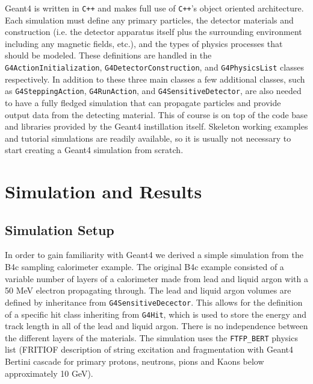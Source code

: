 \documentclass[aps,prd,twocolumn,nofootinbib]{revtex4-1}
\begin{document}
Geant4 is written in \texttt{C++} and makes full use of \texttt{C++}'s object oriented architecture. Each simulation must define any primary particles, the detector materials and construction (i.e. the detector apparatus itself plus the surrounding environment including any magnetic fields, etc.), and the types of physics processes that should be modeled. These definitions are handled in the \texttt{G4ActionInitialization}, \texttt{G4DetectorConstruction}, and \texttt{G4PhysicsList} classes respectively. In addition to these three main classes a few additional classes, such as \texttt{G4SteppingAction}, \texttt{G4RunAction}, and \texttt{G4SensitiveDetector}, are also needed to have a fully fledged simulation that can propagate particles and provide output data from the detecting material. This of course is on top of the code base and libraries provided by the Geant4 instillation itself. Skeleton working examples and tutorial simulations are readily available, so it is usually not necessary to start creating a Geant4 simulation from scratch. 

\section{Simulation and Results}
\subsection{Simulation Setup}
In order to gain familiarity with Geant4 we derived a simple simulation from the B4c sampling calorimeter example. The original B4c example consisted of a variable number of layers of a calorimeter made from lead and liquid argon with a 50 MeV electron propagating through. The lead and liquid argon volumes are defined by inheritance from \texttt{G4SensitiveDecector}. This allows for the definition of a specific hit class inheriting from \texttt{G4Hit}, which is used to store the energy and track length in all of the lead and liquid argon. There is no independence between the different layers of the materials. The simulation uses the \texttt{FTFP\_BERT} physics list (FRITIOF description of string excitation and fragmentation with Geant4 Bertini cascade for primary protons, neutrons, pions and Kaons below approximately 10 GeV).
\end{document}
